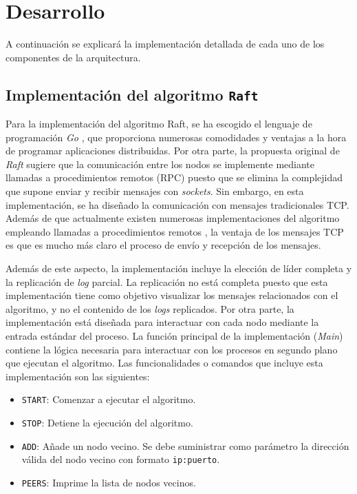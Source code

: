 \chapter{Desarrollo}

A continuación se explicará la implementación detallada de cada uno de los componentes de la arquitectura.

\section{Implementación del algoritmo \texttt{Raft}}
\label{sec:raft}

Para la implementación del algoritmo Raft, se ha escogido el lenguaje de programación \textit{Go} \cite{go}, que proporciona numerosas comodidades y ventajas a la hora de programar aplicaciones distribuidas. Por otra parte, la propuesta original de \textit{Raft} \cite{raft1} sugiere que la comunicación entre los nodos se implemente mediante llamadas a procedimientos remotos (RPC) puesto que se elimina la complejidad que supone enviar y recibir mensajes con \textit{sockets}. Sin embargo, en esta implementación, se ha diseñado la comunicación con mensajes tradicionales TCP. Además de que actualmente existen numerosas implementaciones del algoritmo empleando llamadas a procedimientos remotos \cite{raftetcd}\cite{rafteliben}, la ventaja de los mensajes TCP es que es mucho más claro el proceso de envío y recepción de los mensajes.

Además de este aspecto, la implementación incluye la elección de líder completa y la replicación de \textit{log} parcial. La replicación no está completa puesto que esta implementación tiene como objetivo visualizar los mensajes relacionados con el algoritmo, y no el contenido de los \textit{logs} replicados. Por otra parte, la implementación está diseñada para interactuar con cada nodo mediante la entrada estándar del proceso. La función principal de la implementación (\textit{Main}) contiene la lógica necesaria para interactuar con los procesos en segundo plano que ejecutan el algoritmo. Las funcionalidades o comandos que incluye esta implementación son las siguientes:

\begin{itemize}
\item\texttt{START}: Comenzar a ejecutar el algoritmo.
\item\texttt{STOP}: Detiene la ejecución del algoritmo.
\item\texttt{ADD}: Añade un nodo vecino. Se debe suministrar como parámetro la dirección válida del nodo vecino con formato \texttt{ip:puerto}.
\item\texttt{PEERS}: Imprime la lista de nodos vecinos.
\end{itemize}

